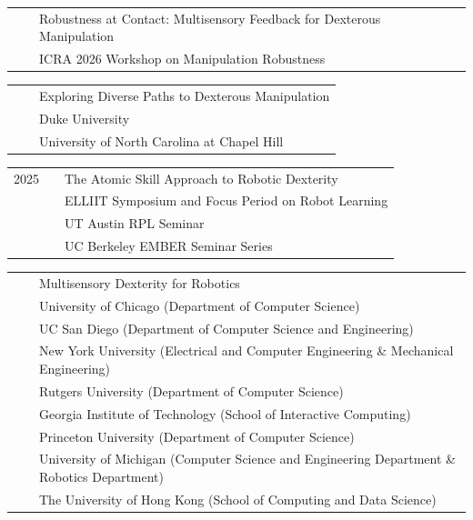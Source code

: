 \documentclass{resume}
\begin{document}
{\renewcommand{\arraystretch}{1.1}
\begin{tabular}{@{}L{0.95cm}L{0.65cm}l@{}}
{} & & {Robustness at Contact: Multisensory Feedback for Dexterous Manipulation} \\  [-0.02cm]
& & {\small ICRA 2026 Workshop on Manipulation Robustness}
\end{tabular}}

{\renewcommand{\arraystretch}{1.1}
\begin{tabular}{@{}L{0.95cm}L{0.65cm}l@{}}
& & {Exploring Diverse Paths to Dexterous Manipulation} \\  [-0.02cm]
& & {\small Duke University} \\ [-0.02cm]
& & {\small University of North Carolina at Chapel Hill}
\end{tabular}}

{\renewcommand{\arraystretch}{1.1}
\begin{tabular}{@{}L{0.95cm}L{0.65cm}l@{}}
{2025} & & {The Atomic Skill Approach to Robotic Dexterity} \\  [-0.02cm]
& & {\small ELLIIT Symposium and Focus Period on Robot Learning} \\ [-0.02cm]
& & {\small UT Austin RPL Seminar} \\ [-0.02cm]
& & {\small UC Berkeley EMBER Seminar Series} \\
\end{tabular}}


{\renewcommand{\arraystretch}{1.1}
\begin{tabular}{@{}L{0.95cm}L{0.65cm}l@{}}
{} & & {Multisensory Dexterity for Robotics} \\  [-0.02cm]
& & {\small University of Chicago (Department of Computer Science)} \\ [-0.02cm]
& & {\small UC San Diego (Department of Computer Science and Engineering)} \\ [-0.02cm]
& & {\small New York University (Electrical and Computer Engineering \& Mechanical Engineering)} \\ [-0.02cm]
& & {\small Rutgers University (Department of Computer Science)} \\ [-0.02cm]
& & {\small Georgia Institute of Technology (School of Interactive Computing)} \\ [-0.02cm]
& & {\small Princeton University (Department of Computer Science)} \\ [-0.02cm]
& & {\small University of Michigan (Computer Science and Engineering Department \& Robotics Department)} \\ [-0.02cm]
& & {\small The University of Hong Kong (School of Computing and Data Science)} \\
\end{tabular}}
\end{document}
